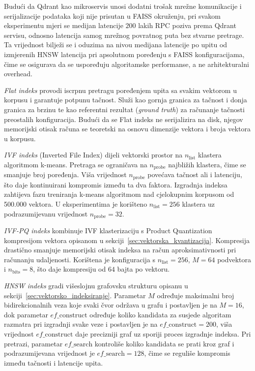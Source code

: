 Budući da \foreignlanguage{english}{Qdrant} kao mikroservis unosi dodatni
trošak mrežne komunikacije i serijalizacije podataka koji nije prisutan u
\foreignlanguage{english}{FAISS} okruženju, pri svakom eksperimentu mjeri
se medijan latencije $200$ lakih RPC poziva prema
\foreignlanguage{english}{Qdrant} servisu, odnosno latencija
samog mrežnog povratnog puta bez stvarne pretrage.
Ta vrijednost bilježi se i oduzima na nivou medijana latencije po upitu od
izmjerenih \foreignlanguage{english}{HNSW}
latencija pri apsolutnom poređenju s \foreignlanguage{english}{FAISS}
konfiguracijama, čime se osigurava da se uspoređuju algoritamske performanse,
a ne arhitekturalni overhead.

\emph{\foreignlanguage{english}{Flat} indeks} provodi iscrpnu pretragu
poređenjem upita sa svakim vektorom u korpusu i garantuje potpunu tačnost.
Služi kao gornja granica za tačnost i donja granica za brzinu te kao referentni
rezultat (\foreignlanguage{english}{\emph{ground truth}}) za računanje tačnosti
preostalih konfiguracija.
Budući da se
\foreignlanguage{english}{Flat} indeks ne serijalizira na
disk, njegov memorijski otisak računa se teoretski na
osnovu dimenzije vektora i broja vektora u korpusu.

\emph{\foreignlanguage{english}{IVF} indeks}
(\foreignlanguage{english}{Inverted File Index}) dijeli vektorski prostor
na $n_{\mathrm{list}}$ klastera algoritmom k-means. Pretraga se ograničava
na $n_{\mathrm{probe}}$ najbližih klastera, čime se smanjuje broj poređenja.
Viša vrijednost $n_{\mathrm{probe}}$ povećava tačnost ali i latenciju, što
daje kontinuirani kompromis između ta dva faktora. Izgradnja indeksa zahtijeva
fazu treniranja k-means algoritmom nad cjelokupnim korpusom
od 500.000 vektora.
U eksperimentima je korišteno $n_{\mathrm{list}} = 256$ klastera uz
podrazumijevanu vrijednost $n_{\mathrm{probe}} = 32$.

\emph{\foreignlanguage{english}{IVF-PQ} indeks} kombinuje
\foreignlanguage{english}{IVF} klasterizaciju s
\foreignlanguage{english}{Product Quantization} kompresijom vektora opisanom
u sekciji~\ref{sec:vektorska_kvantizacija}. Kompresija drastično smanjuje
memorijski otisak indeksa na račun aproksimativnosti pri računanju udaljenosti.
Korištena je konfiguracija s $n_{\mathrm{list}} = 256$, $M = 64$
podvektora i $n_{\mathrm{bits}} = 8$, što daje kompresiju od $64$ bajta
po vektoru.

\emph{\foreignlanguage{english}{HNSW} indeks} gradi
višeslojnu grafovsku strukturu opisanu u
sekciji~\ref{sec:vektorsko_indeksiranje}.
Parametar $M$ određuje maksimalni broj bidirekcionalnih veza koje svaki
čvor održava u grafu i postavljen je na $M = 16$, dok parametar
$ef\_\mathrm{construct}$ određuje
koliko kandidata za susjede algoritam razmatra pri izgradnji svake veze i
postavljen je na $ef\_\mathrm{construct} = 200$, viša
vrijednost $ef\_\mathrm{construct}$ daje precizniji graf uz sporiji
proces izgradnje indeksa. Pri pretrazi, parametar $ef\_\mathrm{search}$
kontroliše koliko kandidata se prati kroz graf i podrazumijevana vrijednost
je $ef\_\mathrm{search} = 128$, čime se reguliše kompromis
između tačnosti i latencije upita.


